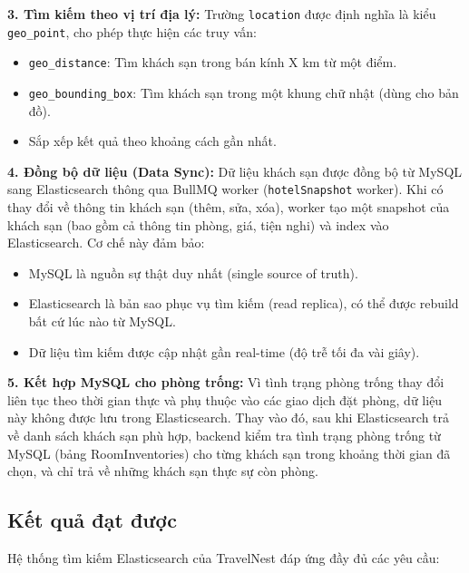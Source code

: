 \documentclass[13pt,a4paper,twoside]{report}
\begin{document}
\textbf{3. Tìm kiếm theo vị trí địa lý:}
Trường \texttt{location} được định nghĩa là kiểu \texttt{geo\_point}, cho phép thực hiện các truy vấn:
\begin{itemize}
  \item \texttt{geo\_distance}: Tìm khách sạn trong bán kính X km từ một điểm.
  \item \texttt{geo\_bounding\_box}: Tìm khách sạn trong một khung chữ nhật (dùng cho bản đồ).
  \item Sắp xếp kết quả theo khoảng cách gần nhất.
\end{itemize}

\textbf{4. Đồng bộ dữ liệu (Data Sync):}
Dữ liệu khách sạn được đồng bộ từ MySQL sang Elasticsearch thông qua BullMQ worker (\texttt{hotelSnapshot} worker). Khi có thay đổi về thông tin khách sạn (thêm, sửa, xóa), worker tạo một snapshot của khách sạn (bao gồm cả thông tin phòng, giá, tiện nghi) và index vào Elasticsearch. Cơ chế này đảm bảo:
\begin{itemize}
  \item MySQL là nguồn sự thật duy nhất (single source of truth).
  \item Elasticsearch là bản sao phục vụ tìm kiếm (read replica), có thể được rebuild bất cứ lúc nào từ MySQL.
  \item Dữ liệu tìm kiếm được cập nhật gần real-time (độ trễ tối đa vài giây).
\end{itemize}

\textbf{5. Kết hợp MySQL cho phòng trống:}
Vì tình trạng phòng trống thay đổi liên tục theo thời gian thực và phụ thuộc vào các giao dịch đặt phòng, dữ liệu này không được lưu trong Elasticsearch. Thay vào đó, sau khi Elasticsearch trả về danh sách khách sạn phù hợp, backend kiểm tra tình trạng phòng trống từ MySQL (bảng RoomInventories) cho từng khách sạn trong khoảng thời gian đã chọn, và chỉ trả về những khách sạn thực sự còn phòng.

\subsection{Kết quả đạt được}

Hệ thống tìm kiếm Elasticsearch của TravelNest đáp ứng đầy đủ các yêu cầu:
\end{document}
